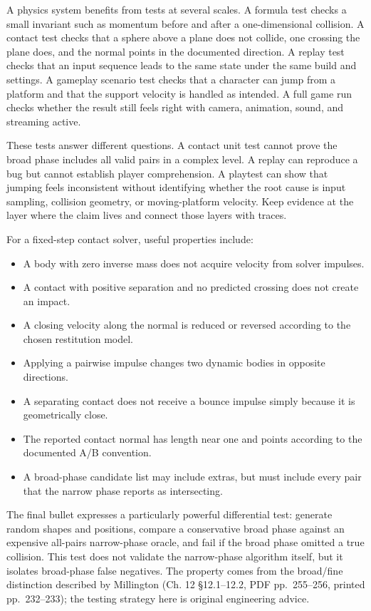A physics system benefits from tests at several scales. A formula test checks a small invariant such as momentum before and after a one-dimensional collision. A contact test checks that a sphere above a plane does not collide, one crossing the plane does, and the normal points in the documented direction. A replay test checks that an input sequence leads to the same state under the same build and settings. A gameplay scenario test checks that a character can jump from a platform and that the support velocity is handled as intended. A full game run checks whether the result still feels right with camera, animation, sound, and streaming active.

These tests answer different questions. A contact unit test cannot prove the broad phase includes all valid pairs in a complex level. A replay can reproduce a bug but cannot establish player comprehension. A playtest can show that jumping feels inconsistent without identifying whether the root cause is input sampling, collision geometry, or moving-platform velocity. Keep evidence at the layer where the claim lives and connect those layers with traces.

For a fixed-step contact solver, useful properties include:

\begin{itemize}
\tightlist
\item
  A body with zero inverse mass does not acquire velocity from solver impulses.
\item
  A contact with positive separation and no predicted crossing does not create an impact.
\item
  A closing velocity along the normal is reduced or reversed according to the chosen restitution model.
\item
  Applying a pairwise impulse changes two dynamic bodies in opposite directions.
\item
  A separating contact does not receive a bounce impulse simply because it is geometrically close.
\item
  The reported contact normal has length near one and points according to the documented A/B convention.
\item
  A broad-phase candidate list may include extras, but must include every pair that the narrow phase reports as intersecting.
\end{itemize}

The final bullet expresses a particularly powerful differential test: generate random shapes and positions, compare a conservative broad phase against an expensive all-pairs narrow-phase oracle, and fail if the broad phase omitted a true collision. This test does not validate the narrow-phase algorithm itself, but it isolates broad-phase false negatives. The property comes from the broad/fine distinction described by Millington (Ch. 12 §12.1--12.2, PDF pp.~255--256, printed pp.~232--233); the testing strategy here is original engineering advice.

